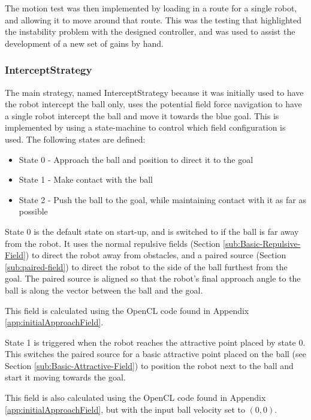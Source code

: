 \documentclass[10pt]{article}
\begin{document}
The motion test was then implemented by loading in a route for a single robot,
and allowing it to move around that route.  This was the testing that
highlighted the instability problem with the designed controller, and was used
to assist the development of a new set of gains by hand.

\subsubsection{InterceptStrategy}

The main strategy, named InterceptStrategy because it was initially used to have
the robot intercept the ball only, uses the potential field force navigation to
have a single robot intercept the ball and move it towards the blue goal.  This
is implemented by using a state-machine to control which field configuration is
used.  The following states are defined:

\begin{itemize}
  \item State 0 - Approach the ball and position to direct it to the goal
  \item State 1 - Make contact with the ball
  \item State 2 - Push the ball to the goal, while maintaining contact with it
  as far as possible
\end{itemize}

State 0 is the default state on start-up, and is switched to if the ball is far
away from the robot.  It uses the normal repulsive fields (Section
\ref{sub:Basic-Repulsive-Field}) to direct the robot away from obstacles, and a
paired source (Section \ref{sub:paired-field}) to direct the robot to the side
of the ball furthest from the goal.  The paired source is aligned so that the
robot's final approach angle to the ball is along the vector between the ball
and the goal.

This field is calculated using the OpenCL code found in Appendix
\ref{app:initialApproachField}.

State 1 is triggered when the robot reaches the attractive point placed by state
0.  This switches the paired source for a basic attractive point placed on the
ball (see Section \ref{sub:Basic-Attractive-Field}) to position the robot next
to the ball and start it moving towards the goal.

This field is also calculated using the OpenCL code found in Appendix
\ref{app:initialApproachField}, but with the input ball velocity set to
$\left(0,0\right)$.
\end{document}
